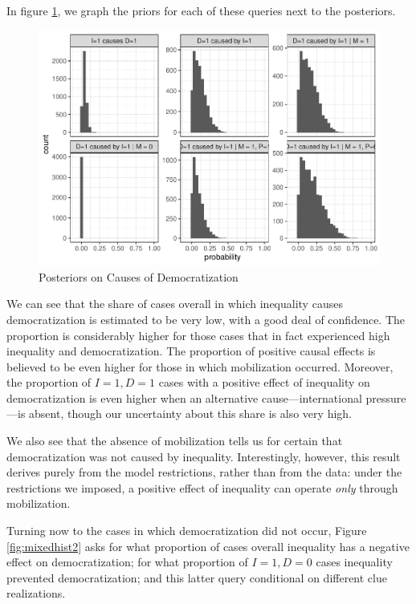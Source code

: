 \documentclass[
  12pt,
]{book}
\begin{document}
In figure \ref{fig:mixedhist}, we graph the priors for each of these queries next to the posteriors.

\begin{figure}

{\centering \includegraphics{ii_files/figure-latex/mixedhist-1} 

}

\caption{Posteriors on Causes of Democratization}\label{fig:mixedhist}
\end{figure}

We can see that the share of cases overall in which inequality causes democratization is estimated to be very low, with a good deal of confidence. The proportion is considerably higher for those cases that in fact experienced high inequality and democratization. The proportion of positive causal effects is believed to be even higher for those in which mobilization occurred. Moreover, the proportion of \(I=1, D=1\) cases with a positive effect of inequality on democratization is even higher when an alternative cause---international pressure---is absent, though our uncertainty about this share is also very high.

We also see that the absence of mobilization tells us for certain that democratization was not caused by inequality. Interestingly, however, this result derives purely from the model restrictions, rather than from the data: under the restrictions we imposed, a positive effect of inequality can operate \emph{only} through mobilization.

Turning now to the cases in which democratization did not occur, Figure \ref{fig:mixedhist2} asks for what proportion of cases overall inequality has a negative effect on democratization; for what proportion of \(I=1, D=0\) cases inequality prevented democratization; and this latter query conditional on different clue realizations.
\end{document}
